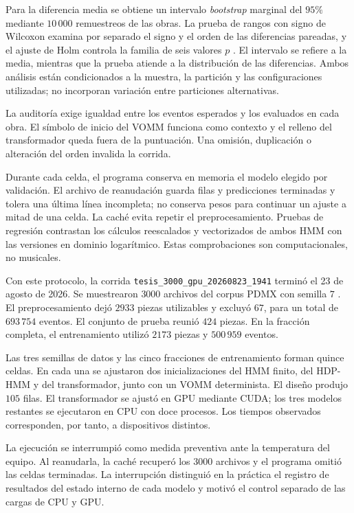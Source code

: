 Para la diferencia media se obtiene un intervalo \emph{bootstrap} marginal del $95\%$ mediante $10\,000$ remuestreos de las obras. La prueba de rangos con signo de Wilcoxon examina por separado el signo y el orden de las diferencias pareadas, y el ajuste de Holm controla la familia de seis valores $p$ \cite{wilcoxon1945,holm1979,efron1979,demsar2006}. El intervalo se refiere a la media, mientras que la prueba atiende a la distribución de las diferencias. Ambos análisis están condicionados a la muestra, la partición y las configuraciones utilizadas; no incorporan variación entre particiones alternativas.

La auditoría exige igualdad entre los eventos esperados y los evaluados en cada obra. El símbolo de inicio del VOMM funciona como contexto y el relleno del transformador queda fuera de la puntuación. Una omisión, duplicación o alteración del orden invalida la corrida.

Durante cada celda, el programa conserva en memoria el modelo elegido por validación. El archivo de reanudación guarda filas y predicciones terminadas y tolera una última línea incompleta; no conserva pesos para continuar un ajuste a mitad de una celda. La caché evita repetir el preprocesamiento. Pruebas de regresión contrastan los cálculos reescalados y vectorizados de ambos HMM con las versiones en dominio logarítmico. Estas comprobaciones son computacionales, no musicales.

Con este protocolo, la corrida \texttt{tesis\_3000\_gpu\_20260823\_1941} terminó el 23 de agosto de 2026. Se muestrearon $3000$ archivos del corpus PDMX con semilla $7$ \cite{long2024pdmx}. El preprocesamiento dejó $2933$ piezas utilizables y excluyó $67$, para un total de $693\,754$ eventos. El conjunto de prueba reunió $424$ piezas. En la fracción completa, el entrenamiento utilizó $2173$ piezas y $500\,959$ eventos.

Las tres semillas de datos y las cinco fracciones de entrenamiento forman quince celdas. En cada una se ajustaron dos inicializaciones del HMM finito, del HDP-HMM y del transformador, junto con un VOMM determinista. El diseño produjo $105$ filas. El transformador se ajustó en GPU mediante CUDA; los tres modelos restantes se ejecutaron en CPU con doce procesos. Los tiempos observados corresponden, por tanto, a dispositivos distintos.

La ejecución se interrumpió como medida preventiva ante la temperatura del equipo. Al reanudarla, la caché recuperó los $3000$ archivos y el programa omitió las celdas terminadas. La interrupción distinguió en la práctica el registro de resultados del estado interno de cada modelo y motivó el control separado de las cargas de CPU y GPU.
